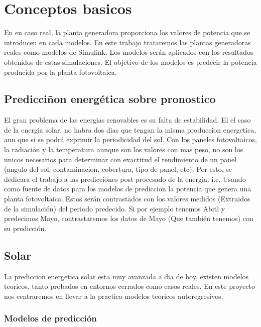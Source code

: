 \chapter{Conceptos basicos}
\label{cha:conceptos_basicos}



En en caso real, la planta generadora proporciona los valores de potencia que se introducen en cada modelos. En este trabajo trataremos las plantas generadoras reales como modelos de Simulink. Los modelos serán aplicados con los resultados obtenidos de estas simulaciones. El objetivo de los modelos es predecir la potencia producida por la planta fotovoltaica. 

\section{Predicciñon energética sobre pronostico} 
\label{sec:prediccion_energetica_sobre_pronostico}

El gran problema de las energias renovables es su falta de estabilidad. El el caso de la energia solar, no habra dos dias que tengan la misma produccion energetica, aun que si se podrá exprimir la periodicidad del sol. 
Con los paneles fotovoltaicos, la radiación y la temperatura aunque son los valores con mas peso, no son los unicos necesarios para determinar con exactitud el rendimiento de un panel (angulo del sol, contaminacion, cobertura, tipo de panel, etc).
Por esto, se dedicara el trabajo a las predicciones post procesado de la energia. i.e. Usando como fuente de datos para los modelos de prediccion la potencia que genera una planta fotovoltaica.
Estos serán contrastados con los valores medidos (Extraidos de la simulación) del periodo predecido.
Si por ejemplo tenemos Abril y predecimos Mayo, contrastaremos los datos de Mayo (Que también tenemos) con su predicción. 	


\section{Solar} 
\label{sec:solar}

La prediccion energetica solar esta muy avanzada a dia de hoy, existen modelos teoricos, tanto probados en entornos cerrados como casos reales. 
En este proyecto nos centraremos en llevar a la practica modelos teoricos autoregresivos.


\subsection{Modelos de predicción} 
\label{sub:modelos_de_prediccion}


